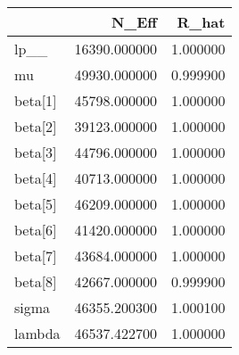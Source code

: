 \begin{tabular}{lrr}
\toprule
 & N\_Eff & R\_hat \\
\midrule
lp\_\_ & 16390.000000 & 1.000000 \\
mu & 49930.000000 & 0.999900 \\
beta[1] & 45798.000000 & 1.000000 \\
beta[2] & 39123.000000 & 1.000000 \\
beta[3] & 44796.000000 & 1.000000 \\
beta[4] & 40713.000000 & 1.000000 \\
beta[5] & 46209.000000 & 1.000000 \\
beta[6] & 41420.000000 & 1.000000 \\
beta[7] & 43684.000000 & 1.000000 \\
beta[8] & 42667.000000 & 0.999900 \\
sigma & 46355.200300 & 1.000100 \\
lambda & 46537.422700 & 1.000000 \\
\bottomrule
\end{tabular}
